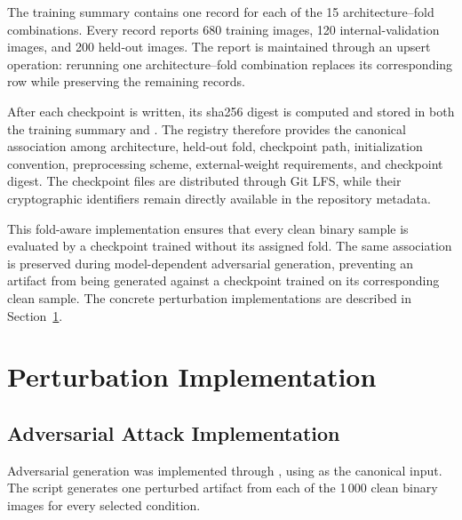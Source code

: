 The training summary contains one record for each of the 15
architecture--fold combinations. Every record reports 680 training images, 120
internal-validation images, and 200 held-out images. The report is maintained
through an upsert operation: rerunning one architecture--fold combination
replaces its corresponding row while preserving the remaining records.

After each checkpoint is written, its \gls{sha256} digest is computed and
stored in both the training summary and
. The registry therefore provides the
canonical association among architecture, held-out fold, checkpoint path,
initialization convention, preprocessing scheme, external-weight requirements,
and checkpoint digest. The checkpoint files are distributed through Git LFS,
while their cryptographic identifiers remain directly available in the
repository metadata.

This fold-aware implementation ensures that every clean binary sample is
evaluated by a checkpoint trained without its assigned fold. The same
association is preserved during model-dependent adversarial generation,
preventing an artifact from being generated against a checkpoint trained on its
corresponding clean sample. The concrete perturbation implementations are
described in Section~\ref{sec:implementation-perturbations}.







\section{Perturbation Implementation}
\label{sec:implementation-perturbations}

\subsection{Adversarial Attack Implementation}
\label{subsec:implementation-adversarial}

Adversarial generation was implemented through
, using
 as the canonical
input. The script generates one perturbed artifact from each of the 1\,000
clean binary images for every selected condition.


